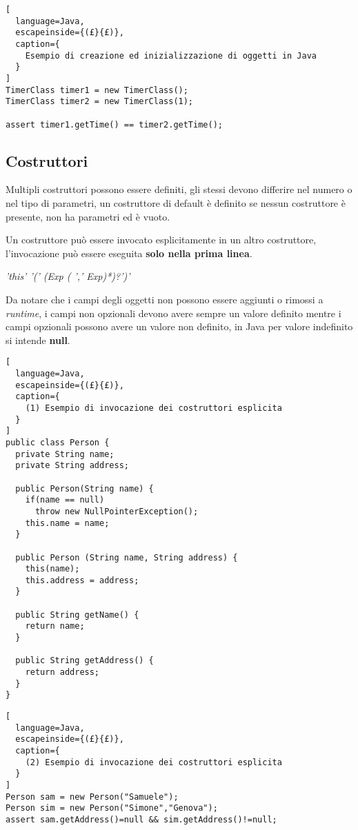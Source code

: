 \begin{lstlisting}[
  language=Java,
  escapeinside={(£}{£)},
  caption={
    Esempio di creazione ed inizializzazione di oggetti in Java
  }
]
TimerClass timer1 = new TimerClass();
TimerClass timer2 = new TimerClass(1);

assert timer1.getTime() == timer2.getTime();
\end{lstlisting}

\subsection{Costruttori}
Multipli costruttori possono essere definiti, gli stessi devono differire nel
numero o nel tipo di parametri, un costruttore di default è definito se
nessun costruttore è presente, non ha parametri ed è vuoto.

Un costruttore può essere invocato esplicitamente in un altro costruttore,
l'invocazione può essere eseguita \textbf{solo nella prima linea}.

\emph{'this' '(' (Exp ( ',' Exp)*)?')'}

Da notare che i campi degli oggetti non possono essere aggiunti o rimossi
a \emph{runtime}, i campi non opzionali devono avere sempre un valore definito
mentre i campi opzionali possono avere un valore non definito, in Java per
valore indefinito si intende \textbf{null}.
\begin{lstlisting}[
  language=Java,
  escapeinside={(£}{£)},
  caption={
    (1) Esempio di invocazione dei costruttori esplicita
  }
]
public class Person {
  private String name;
  private String address;

  public Person(String name) {
    if(name == null)
      throw new NullPointerException();
    this.name = name;
  }

  public Person (String name, String address) {
    this(name);
    this.address = address;
  }

  public String getName() {
    return name;
  }

  public String getAddress() {
    return address;
  }
}
\end{lstlisting}

\begin{lstlisting}[
  language=Java,
  escapeinside={(£}{£)},
  caption={
    (2) Esempio di invocazione dei costruttori esplicita
  }
]
Person sam = new Person("Samuele");
Person sim = new Person("Simone","Genova");
assert sam.getAddress()=null && sim.getAddress()!=null;
\end{lstlisting}

